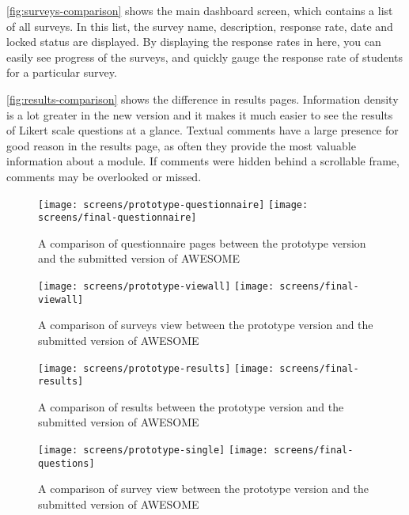 	\autoref{fig:surveys-comparison} shows the main dashboard screen, which contains a list of all surveys.
	In this list, the survey name, description, response rate, date and locked status are displayed.
	By displaying the response rates in here, you can easily see progress of the surveys, and quickly gauge the response rate of students for a particular survey.
	
	\autoref{fig:results-comparison} shows the difference in results pages.
	Information density is a lot greater in the new version and it makes it much easier to see the results of Likert scale questions at a glance.
	Textual comments have a large presence for good reason in the results page, as often they provide the most valuable information about a module.
	If comments were hidden behind a scrollable frame, comments may be overlooked or missed.
	
	\begin{figure}[H]
		\texttt{[image: screens/prototype-questionnaire]}
		\texttt{[image: screens/final-questionnaire]}
		\caption{A comparison of questionnaire pages between the prototype version and the submitted version of \acs{AWESOME}}
		\label{fig:questionnaire-comparison}
	\end{figure}
	
	\begin{figure}[H]
		\texttt{[image: screens/prototype-viewall]}
		\texttt{[image: screens/final-viewall]}
		\caption{A comparison of surveys view between the prototype version and the submitted version of \acs{AWESOME}}
		\label{fig:surveys-comparison}
	\end{figure}
	
	\begin{figure}[H]
		\texttt{[image: screens/prototype-results]}
		\texttt{[image: screens/final-results]}
		\caption{A comparison of results between the prototype version and the submitted version of \acs{AWESOME}}
		\label{fig:results-comparison}
	\end{figure}
	
	\begin{figure}[H]
		\texttt{[image: screens/prototype-single]}
		\texttt{[image: screens/final-questions]}
		\caption{A comparison of survey view between the prototype version and the submitted version of \acs{AWESOME}}
		\label{fig:view-comparison}
	\end{figure}
	
